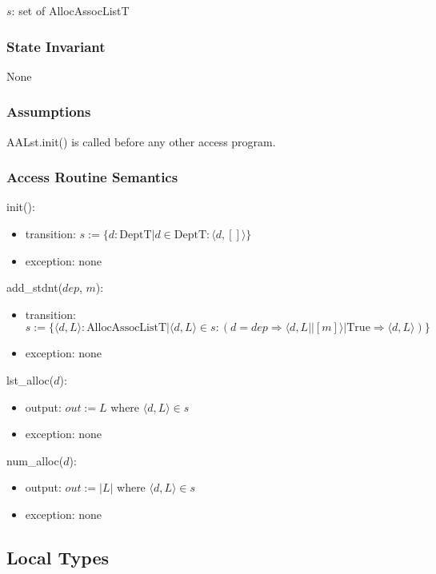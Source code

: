 \documentclass[12pt]{article}
\begin{document}
$s$: set of AllocAssocListT

\subsubsection* {State Invariant}

None

\subsubsection* {Assumptions}

AALst.init() is called before any other access program.

\subsubsection* {Access Routine Semantics}

\noindent init():
\begin{itemize}
\item transition: $s := \{ d: \text{DeptT} | d \in \text{DeptT} : \langle d, []
  \rangle \}$
\item exception: none
\end{itemize}

\noindent add\_stdnt($\mathit{dep}$, $m$):
\begin{itemize}
\item transition: $s := \{ \langle d, L \rangle : \text{AllocAssocListT} |
  \langle d, L \rangle \in s : (d = \mathit{dep} \Rightarrow \langle d, L || [m] \rangle
   | \text{True} \Rightarrow \langle d, L \rangle) \}$
\item exception: none
\end{itemize}

\noindent lst\_alloc($d$):
\begin{itemize}
\item output: $out := L$ where $\langle d, L \rangle \in s$
\item exception: none
\end{itemize}

\noindent num\_alloc($d$):
\begin{itemize}
\item output: $out := |L|$ where $\langle d, L \rangle \in s$
\item exception: none
\end{itemize}

\subsection*{Local Types}
\end{document}
